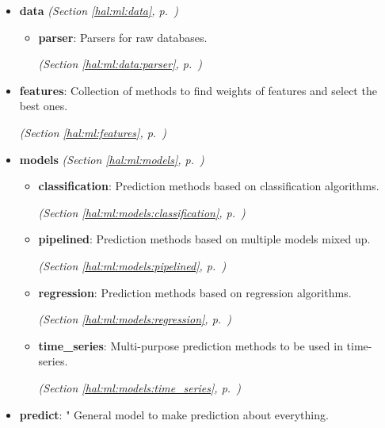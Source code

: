 \begin{itemize}
\begin{itemize}
\begin{itemize}
      \end{itemize}
    \item \textbf{data}
  \textit{(Section \ref{hal:ml:data}, p.~\pageref{hal:ml:data})}

      \begin{itemize}
    \setlength{\parskip}{0ex}
        \item \textbf{parser}: Parsers for raw databases. 


  \textit{(Section \ref{hal:ml:data:parser}, p.~\pageref{hal:ml:data:parser})}

      \end{itemize}
    \item \textbf{features}: Collection of methods to find weights of features and select the best ones. 


  \textit{(Section \ref{hal:ml:features}, p.~\pageref{hal:ml:features})}

    \item \textbf{models}
  \textit{(Section \ref{hal:ml:models}, p.~\pageref{hal:ml:models})}

      \begin{itemize}
    \setlength{\parskip}{0ex}
        \item \textbf{classification}: Prediction methods based on classification algorithms. 


  \textit{(Section \ref{hal:ml:models:classification}, p.~\pageref{hal:ml:models:classification})}

        \item \textbf{pipelined}: Prediction methods based on multiple models mixed up. 


  \textit{(Section \ref{hal:ml:models:pipelined}, p.~\pageref{hal:ml:models:pipelined})}

        \item \textbf{regression}: Prediction methods based on regression algorithms. 


  \textit{(Section \ref{hal:ml:models:regression}, p.~\pageref{hal:ml:models:regression})}

        \item \textbf{time\_series}: Multi-purpose prediction methods to be used in time-series. 


  \textit{(Section \ref{hal:ml:models:time_series}, p.~\pageref{hal:ml:models:time_series})}

      \end{itemize}
    \item \textbf{predict}: " General model to make prediction about everything. 



\end{itemize}
\end{itemize}
